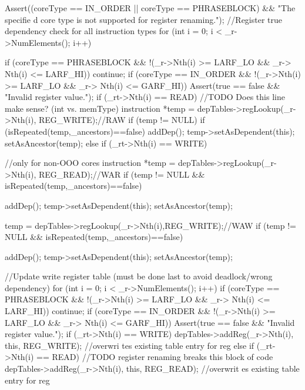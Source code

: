 \begin{DoxyCode}
                                                                               {
        Assert((coreType == IN_ORDER || coreType == PHRASEBLOCK) && "The specifie
      d core type is not supported for register renaming.");
        //Register true dependency check for all instruction types
        for (int i = 0; i < _r->NumElements(); i++) {
                if (coreType == PHRASEBLOCK && !(_r->Nth(i) >= LARF_LO && _r->
      Nth(i) <= LARF_HI)) continue;
                if (coreType == IN_ORDER    && !(_r->Nth(i) >= LARF_LO && _r->
      Nth(i) <= GARF_HI)) Assert(true == false && "Invalid register value.");
                if (_rt->Nth(i) == READ) { //TODO Does this line make sense? (int
       vs. memType)
                        instruction *temp = depTables->regLookup(_r->Nth(i),
      REG_WRITE);//RAW
                        if (temp != NULL) {
                                if (isRepeated(temp,_ancestors)==false) {
                                        addDep();
                                        temp->setAsDependent(this);
                                        setAsAncestor(temp);
                                }
                        }
                } else if (_rt->Nth(i) == WRITE) {
                        //only for non-OOO cores
                        instruction *temp = depTables->regLookup(_r->Nth(i),
      REG_READ);//WAR
                        if (temp != NULL && isRepeated(temp,_ancestors)==false) {
      
                                addDep();
                                temp->setAsDependent(this);
                                setAsAncestor(temp);
                        }
                        temp = depTables->regLookup(_r->Nth(i),REG_WRITE);//WAW
                        if (temp != NULL && isRepeated(temp,_ancestors)==false) {
      
                                addDep();
                                temp->setAsDependent(this);
                                setAsAncestor(temp);
                        }
                }
        }
        //Update write register table (must be done last to avoid deadlock/wrong 
      dependency)
        for (int i = 0; i < _r->NumElements(); i++) {
                if (coreType == PHRASEBLOCK && !(_r->Nth(i) >= LARF_LO && _r->
      Nth(i) <= LARF_HI)) continue;
                if (coreType == IN_ORDER    && !(_r->Nth(i) >= LARF_LO && _r->
      Nth(i) <= GARF_HI)) Assert(true == false && "Invalid register value.");
                if (_rt->Nth(i) == WRITE) {
                        depTables->addReg(_r->Nth(i), this, REG_WRITE); //overwri
      tes existing table entry for reg
                } else if (_rt->Nth(i) == READ) { //TODO register renaming breaks
       this block of code
                        depTables->addReg(_r->Nth(i), this, REG_READ); //overwrit
      es existing table entry for reg
                }
        }
}
\end{DoxyCode}
